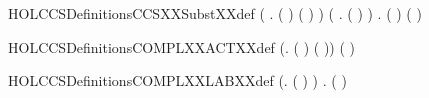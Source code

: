 \begin{SaveVerbatim}{HOLCCSDefinitionsCCSXXSubstXXdef}
   (\HOLSymConst{\HOLTokenForall{}}   .
         (  )   \HOLSymConst{=}  (   ) ) \HOLSymConst{\HOLTokenConj{}}
   (\HOLSymConst{\HOLTokenForall{}}  .
         ( )   \HOLSymConst{=}   \HOLSymConst{=}      ) \HOLSymConst{\HOLTokenConj{}}
   \HOLSymConst{\HOLTokenForall{}}   .
        (  )   \HOLSymConst{=}   \HOLSymConst{=}     
          (   )
\end{SaveVerbatim}
\newcommand{\HOLCCSDefinitionsCCSXXSubstXXdef}{\UseVerbatim{HOLCCSDefinitionsCCSXXSubstXXdef}}
\begin{SaveVerbatim}{HOLCCSDefinitionsCOMPLXXACTXXdef}
\HOLTokenTurnstile{} (\HOLSymConst{\HOLTokenForall{}}.  ( ) \HOLSymConst{=}  ( )) \HOLSymConst{\HOLTokenConj{}} ( \HOLConst{\ensuremath{\tau}} \HOLSymConst{=} \HOLConst{\ensuremath{\tau}})
\end{SaveVerbatim}
\newcommand{\HOLCCSDefinitionsCOMPLXXACTXXdef}{\UseVerbatim{HOLCCSDefinitionsCOMPLXXACTXXdef}}
\begin{SaveVerbatim}{HOLCCSDefinitionsCOMPLXXLABXXdef}
\HOLTokenTurnstile{} (\HOLSymConst{\HOLTokenForall{}}.  ( ) \HOLSymConst{=}  ) \HOLSymConst{\HOLTokenConj{}}
   \HOLSymConst{\HOLTokenForall{}}.  ( ) \HOLSymConst{=}  
\end{SaveVerbatim}
\newcommand{\HOLCCSDefinitionsCOMPLXXLABXXdef}{\UseVerbatim{HOLCCSDefinitionsCOMPLXXLABXXdef}}
